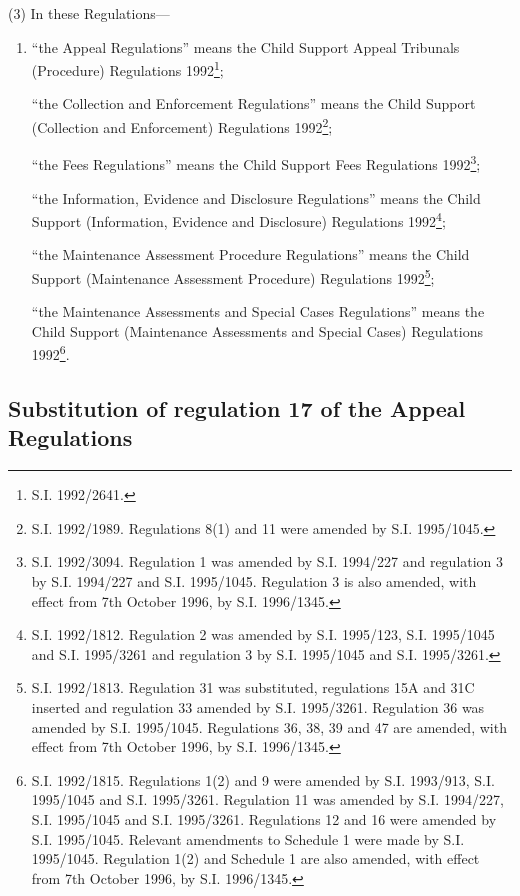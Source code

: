 \documentclass[12pt,a4paper]{article}
\begin{document}
(3) In these Regulations—
\begin{enumerate}\item[]
“the Appeal Regulations” means the Child Support Appeal Tribunals (Procedure) Regulations 1992\footnote{\frenchspacing S.I. 1992/2641.};

“the Collection and Enforcement Regulations” means the Child Support (Collection and Enforcement) Regulations 1992\footnote{\frenchspacing S.I. 1992/1989. Regulations 8(1) and 11 were amended by S.I. 1995/1045.};

“the Fees Regulations” means the Child Support Fees Regulations 1992\footnote{\frenchspacing S.I. 1992/3094. Regulation 1 was amended by S.I. 1994/227 and regulation 3 by S.I. 1994/227 and S.I. 1995/1045. Regulation 3 is also amended, with effect from 7th October 1996, by S.I. 1996/1345.};

“the Information, Evidence and Disclosure Regulations” means the Child Support (Information, Evidence and Disclosure) Regulations 1992\footnote{\frenchspacing S.I. 1992/1812. Regulation 2 was amended by S.I. 1995/123, S.I. 1995/1045 and S.I. 1995/3261 and regulation 3 by S.I. 1995/1045 and S.I. 1995/3261.};

“the Maintenance Assessment Procedure Regulations” means the Child Support (Maintenance Assessment Procedure) Regulations 1992\footnote{\frenchspacing S.I. 1992/1813. Regulation 31 was substituted, regulations 15A and 31C inserted and regulation 33 amended by S.I. 1995/3261. Regulation 36 was amended by S.I. 1995/1045. Regulations 36, 38, 39 and 47 are amended, with effect from 7th October 1996, by S.I. 1996/1345.};

“the Maintenance Assessments and Special Cases Regulations” means the Child Support (Maintenance Assessments and Special Cases) Regulations 1992\footnote{\frenchspacing S.I. 1992/1815. Regulations 1(2) and 9 were amended by S.I. 1993/913, S.I. 1995/1045 and S.I. 1995/3261. Regulation 11 was amended by S.I. 1994/227, S.I. 1995/1045 and S.I. 1995/3261. Regulations 12 and 16 were amended by S.I. 1995/1045. Relevant amendments to Schedule 1 were made by S.I. 1995/1045. Regulation 1(2) and Schedule 1 are also amended, with effect from 7th October 1996, by S.I. 1996/1345.}.
\end{enumerate}

\subsection[2. Substitution of regulation 17 of the Appeal Regulations]{Substitution of regulation 17 of the Appeal Regulations}
\end{document}

